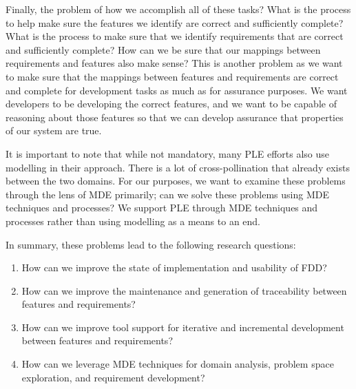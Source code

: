 Finally, the problem of how we accomplish all of these tasks? What is the process to help make sure the features we identify are correct and sufficiently complete? What is the process to make sure that we identify requirements that are correct and sufficiently complete? How can we be sure that our mappings between requirements and features also make sense? This is another problem as we want to make sure that the mappings between features and requirements are correct and complete for development tasks as much as for assurance purposes. We want developers to be developing the correct features, and we want to be capable of reasoning about those features so that we can develop assurance that properties of our system are true.


It is important to note that while not mandatory, many \ac{PLE} efforts also use modelling in their approach. There is a lot of cross-pollination that already exists between the two domains. For our purposes, we want to examine these problems through the lens of \ac{MDE} primarily; can we solve these problems using \ac{MDE} techniques and processes? We support \ac{PLE} through \ac{MDE} techniques and processes rather than using modelling as a means to an end.

In summary, these problems lead to the following research questions:
\begin{enumerate}[label=\textbf{RQ.\arabic*}]
	\item \label{RQ1} How can we improve the state of implementation and usability of \ac{FDD}?
	\item \label{RQ2} How can we improve the maintenance and generation of traceability between features and requirements?
	\item \label{RQ3} How can we improve tool support for iterative and incremental development between features and requirements?
	\item \label{RQ4} How can we leverage \ac{MDE} techniques for domain analysis, problem space exploration, and requirement development?
\end{enumerate}


